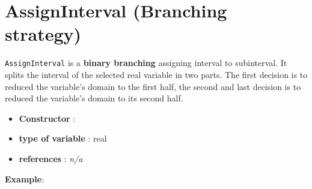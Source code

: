 \section{AssignInterval (Branching strategy)}\label{assigninterval:assignintervalbranchstrat}\hypertarget{assigninterval:assignintervalbranchstrat}{}
\begin{notedef}
  \texttt{AssignInterval} is a \textbf{binary branching} assigning interval to subinterval. It splits the interval of the selected real variable in two parts. The first decision is to reduced the variable's domain to the first half, the second and last decision is to reduced the variable's domain to its second half. 
\end{notedef}

\begin{itemize}
	\item \textbf{Constructor} :
	\item \textbf{type of variable} : real
	\item \textbf{references} : \emph{n/a}
\end{itemize}

\textbf{Example}:
%


